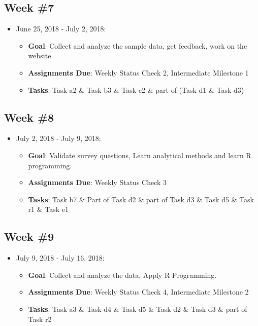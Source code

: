 \documentclass{sigchi}
\begin{document}
 \subsection{Week \#7}
\begin{itemize}
 	\item June 25, 2018 - July 2, 2018:
	\begin{itemize}
 		\item \textbf{Goal}: Collect and analyze the sample data, get feedback, work on the website.
 		\item \textbf{Assignments Due}: Weekly Status Check 2, Intermediate Milestone 1
 		\item \textbf{Tasks}: Task a2 \& Task b3 \& Task c2  \& part of (Task d1 \& Task d3)
 	\end{itemize} 
\end{itemize}
 
 \subsection{Week \#8}
\begin{itemize}
 	\item July 2, 2018 - July 9, 2018:
	\begin{itemize}
 		\item \textbf{Goal}: Validate survey questions, Learn analytical methods and learn R programming.
 		\item \textbf{Assignments Due}: Weekly Status Check 3
 		\item \textbf{Tasks}: Task b7  \& Part of Task d2 \& part of Task d3 \& Task d5 \& Task r1 \& Task e1 
	\end{itemize} 
 \end{itemize} 
 
 \subsection{Week \#9}
\begin{itemize}
 	\item July 9, 2018 - July 16, 2018:
	\begin{itemize}
	 	\item \textbf{Goal}: Collect and analyze the data, Apply R Programming.
 		\item \textbf{Assignments Due}: Weekly Status Check 4, Intermediate Milestone 2
 		\item \textbf{Tasks}: Task a3 \& Task d4 \& Task d5 \& Task d2 \& Task d3 \& part of Task r2
	\end{itemize} 
 \end{itemize} 
 
\end{document}
